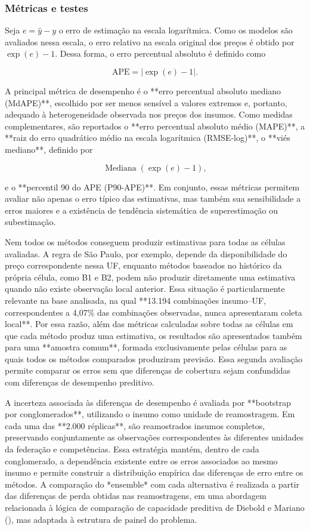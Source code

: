 \subsubsection{Métricas e testes}

Seja \(e=\widehat{y}-y\) o erro de estimação na escala logarítmica. Como os modelos são avaliados nessa escala, o erro relativo 
na escala original dos preços é obtido por \(\exp(e)-1\). Dessa forma, o erro percentual absoluto é definido como

\[
\mathrm{APE}
=
\left|\exp(e)-1\right|.
\]

A principal métrica de desempenho é o **erro percentual absoluto mediano (MdAPE)**, escolhido por ser menos sensível a valores 
extremos e, portanto, adequado à heterogeneidade observada nos preços dos insumos. Como medidas complementares, são reportados 
o **erro percentual absoluto médio (MAPE)**, a **raiz do erro quadrático médio na escala logarítmica (RMSE-log)**, o **viés 
mediano**, definido por

\[
\operatorname{Mediana}\left(\exp(e)-1\right),
\]

e o **percentil 90 do APE (P90-APE)**. Em conjunto, essas métricas permitem avaliar não apenas o erro típico das estimativas, 
mas também sua sensibilidade a erros maiores e a existência de tendência sistemática de superestimação ou subestimação.

Nem todos os métodos conseguem produzir estimativas para todas as células avaliadas. A regra de São Paulo, por exemplo, 
depende da disponibilidade do preço correspondente nessa UF, enquanto métodos baseados no histórico da própria célula, como B1 
e B2, podem não produzir diretamente uma estimativa quando não existe observação local anterior. Essa situação é particularmente 
relevante na base analisada, na qual **13.194 combinações insumo--UF, correspondentes a 4,07\% das combinações observadas, nunca 
apresentaram coleta local**. Por essa razão, além das métricas calculadas sobre todas as células em que cada método produz uma 
estimativa, os resultados são apresentados também para uma **amostra comum**, formada exclusivamente pelas células para as quais 
todos os métodos comparados produziram previsão. Essa segunda avaliação permite comparar os erros sem que diferenças de cobertura 
sejam confundidas com diferenças de desempenho preditivo.

A incerteza associada às diferenças de desempenho é avaliada por **bootstrap por conglomerados**, utilizando o insumo como 
unidade de reamostragem. Em cada uma das **2.000 réplicas**, são reamostrados insumos completos, preservando conjuntamente as 
observações correspondentes às diferentes unidades da federação e competências. Essa estratégia mantém, dentro de cada 
conglomerado, a dependência existente entre os erros associados ao mesmo insumo e permite construir a distribuição empírica das 
diferenças de erro entre os métodos. A comparação do *ensemble* com cada alternativa é realizada a partir das diferenças de perda 
obtidas nas reamostragens, em uma abordagem relacionada à lógica de comparação de capacidade preditiva de Diebold e Mariano (), 
mas adaptada à estrutura de painel do problema.

